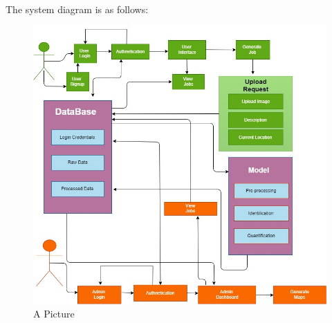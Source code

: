 The system diagram is as follows:
\begin{figure}[!hb]
   \centering
   \includegraphics[scale=0.5]{images/8.jpeg}
   \caption{A Picture}\label{fig:picture}
\end{figure}